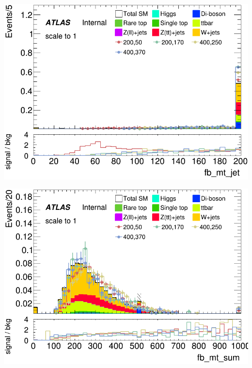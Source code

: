 \documentclass[usenames,dvipsnames]{beamer}
\begin{document}
\begin{frame}
    \hfill
    \begin{minipage}{0.25\textwidth}
        \centering
        \includegraphics[width=\textwidth]{graphics/LH_met_sig/LH_fb_mt_jet_norm.png}
    \end{minipage}
    \hfill
    \begin{minipage}{0.25\textwidth}
        \centering
        \includegraphics[width=\textwidth]{graphics/LH_met_sig/LH_fb_mt_sum_norm.png}
    \end{minipage}
\end{frame}
\end{document}
